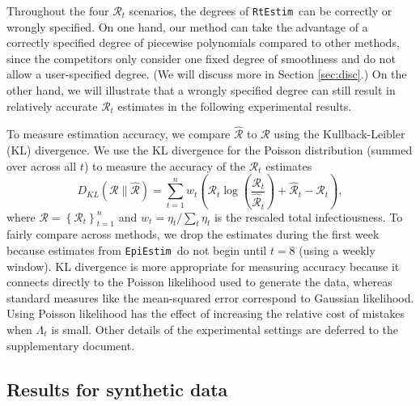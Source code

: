 \documentclass[10pt,letterpaper]{article}
\newcommand{\lr}[1]{\left(#1\right)}
\def\RtEstim{\texttt{RtEstim}}
\def\EpiEstim{\texttt{EpiEstim}}
\def\calR{\mathcal{R}}
\begin{document}
Throughout the four $\calR_t$ scenarios, the degrees of \RtEstim\ can be correctly or wrongly specified. 
On one hand, our method can take the advantage of a correctly specified degree 
of piecewise polynomials compared to other methods, since the competitors only consider
one fixed degree of smoothness and do not allow a user-specified degree. 
(We will discuss more in Section \ref{sec:disc}.) 
On the other hand, we will illustrate that a wrongly specified degree can still 
result in relatively accurate $\calR_t$ estimates in the following experimental results. 


To measure estimation accuracy, we compare $\widehat{\calR}$ to $\calR$ using
the Kullback-Leibler (KL) divergence. We use the KL divergence for the
Poisson distribution (summed over across all $t$) to measure the accuracy
of the $\calR_t$ estimates 
\begin{equation}
  D_{KL}(\calR \parallel \widehat{\calR}) = \sum_{t=1}^n w_t \lr{\calR_t
  \log\left(\frac{\calR_t} {\widehat{\calR}_t}\right) + \widehat{\calR}_t -
{\calR}_t},
\end{equation}
where $\calR = \left\{ \calR_t \right\}_{t=1}^n$ and $w_t = \eta_t
/ \sum_t \eta_t$ is the rescaled total infectiousness. To fairly compare across
methods, we drop the estimates during the first week because estimates from
\EpiEstim\ do not begin until $t=8$ (using a weekly window). KL divergence is
more appropriate for measuring accuracy because it connects directly to the
Poisson likelihood used to generate the data, whereas standard measures like the
mean-squared error correspond to Gaussian likelihood. Using Poisson likelihood
has the effect of increasing the relative cost of mistakes when $\Lambda_t$ is
small. Other details of the experimental settings are deferred to the 
supplementary document. 


\subsection{Results for synthetic data}
\end{document}
